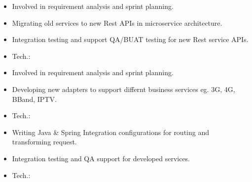 \documentclass[9pt,a4paper,ragged2e,withhyper]{altacv}
\begin{document}
\begin{paracol}{2}
\divider

\begin{itemize}
\item Involved in requirement analysis and sprint planning.
\item Migrating old services to new Rest APIs in microservice architecture.
\item Integration testing and support QA/BUAT testing for new Rest service APIs.
\item Tech.:    
\end{itemize}

\divider

\begin{itemize}
  \item Involved in requirement analysis and sprint planning.
  \item Developing new adapters to support differnt business services eg. 3G, 4G, BBand, IPTV.
  \item Tech.:    
\end{itemize}

\divider

\begin{itemize}
  \item Writing Java \& Spring Integration configurations for routing and transforming request.
  \item Integration testing and QA support for developed services.
\item Tech.:     
\end{itemize}






\end{paracol}
\end{document}
